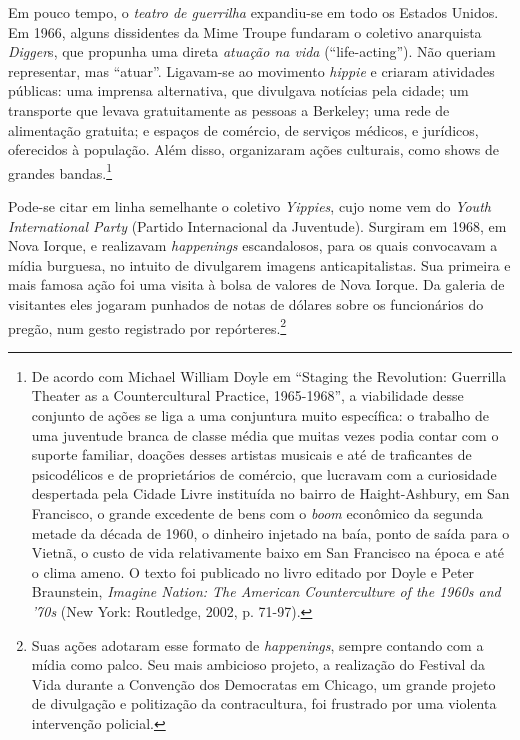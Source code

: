 Em pouco tempo, o \textit{teatro de guerrilha} expandiu-se em todo os
Estados Unidos. Em 1966, alguns dissidentes da Mime Troupe fundaram o
coletivo anarquista \textit{Digger}s, que propunha uma direta \textit{atuação
na vida} (“life-acting”). Não queriam representar, mas “atuar”.
Ligavam-se ao movimento \textit{hippie} e criaram atividades públicas: uma
imprensa alternativa, que divulgava notícias pela cidade; um transporte
que levava gratuitamente as pessoas a Berkeley; uma rede de alimentação
gratuita; e espaços de comércio, de serviços médicos, e jurídicos,
oferecidos à população. Além disso, organizaram ações culturais, como
shows de grandes bandas.\footnote{De acordo com Michael William Doyle em
  “Staging the Revolution: Guerrilla Theater as a Countercultural
  Practice, 1965-1968”, a viabilidade desse conjunto de ações se liga a
  uma conjuntura muito específica: o trabalho de uma juventude branca de
  classe média que muitas vezes podia contar com o suporte familiar,
  doações desses artistas musicais e até de traficantes de psicodélicos
  e de proprietários de comércio, que lucravam com a curiosidade
  despertada pela Cidade Livre instituída no bairro de Haight-Ashbury,
  em San Francisco, o grande excedente de bens com o \textit{boom}
  econômico da segunda metade da década de 1960, o dinheiro injetado na
  baía, ponto de saída para o Vietnã, o custo de vida relativamente
  baixo em San Francisco na época e até o clima ameno. O texto foi
  publicado no livro editado por Doyle e Peter Braunstein, \textit{Imagine
  Nation: The American Counterculture of the 1960s and '70s} (New York:
  Routledge, 2002, p. 71-97).}

Pode-se citar em linha semelhante o coletivo \textit{Yippies}, cujo nome
vem do \textit{Youth International Party} (Partido Internacional da
Juventude). Surgiram em 1968, em Nova Iorque, e realizavam
\textit{happenings} escandalosos, para os quais convocavam a mídia
burguesa, no intuito de divulgarem imagens anticapitalistas. Sua
primeira e mais famosa ação foi uma visita à bolsa de valores de Nova
Iorque. Da galeria de visitantes eles jogaram punhados de notas de
dólares sobre os funcionários do pregão, num gesto registrado por
repórteres.\footnote{Suas ações adotaram esse formato de
  \textit{happenings}, sempre contando com a mídia como palco. Seu mais
  ambicioso projeto, a realização do Festival da Vida durante a
  Convenção dos Democratas em Chicago, um grande projeto de divulgação e
  politização da contracultura, foi frustrado por uma violenta
  intervenção policial.}

